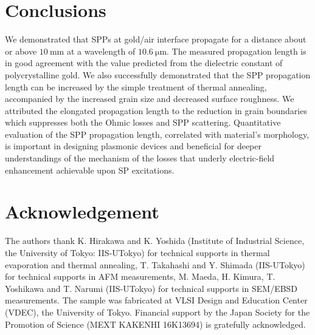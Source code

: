 \documentclass[aip,apl,reprint]{revtex4-1}
\begin{document}
\section{Conclusions}
\label{sec:conclusion}
We demonstrated that SPPs at gold/air interface propagate for a distance about or above $10\:\mathrm{mm}$ at a wavelength of $10.6\:\mathrm{\mu m}$. The measured propagation length is in good agreement with the value predicted from the dielectric constant of polycrystalline gold. We also successfully demonstrated that the SPP propagation length can be increased by the simple treatment of thermal annealing, accompanied by the increased grain size and decreased surface roughness. 
We attributed the elongated propagation length to the reduction in grain boundaries which suppresses both the Ohmic losses and SPP scattering.
Quantitative evaluation of the SPP propagation length, correlated with material's morphology, is important in designing plasmonic devices and beneficial for deeper understandings of the mechanism of the losses that underly electric-field enhancement achievable upon SP excitations.

\section*{Acknowledgement}
The authors thank K. Hirakawa and K. Yoshida (Institute of Industrial Science, the University of Tokyo: IIS-UTokyo) for technical supports in thermal evaporation and thermal annealing, T. Takahashi and Y. Shimada (IIS-UTokyo) for technical supports in AFM measurements, M. Maeda, H. Kimura, T. Yoshikawa and T. Narumi (IIS-UTokyo) for technical supports in SEM/EBSD measurements.
The sample was fabricated at VLSI Design and Education Center (VDEC), the University of Tokyo. Financial support by the Japan Society for the Promotion of Science (MEXT KAKENHI 16K13694) is gratefully acknowledged.


\end{document}
